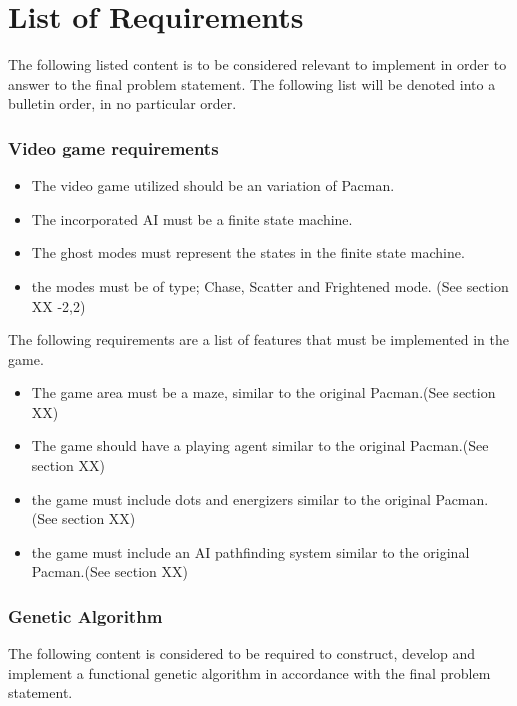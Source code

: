 \section{List of Requirements} \label{sec:lor}

The following listed content is to be considered relevant to implement in order to answer to the final problem statement. The following list will be denoted into a bulletin order, in no particular order.

\subsubsection{Video game requirements}

\begin{itemize}
\item The video game utilized should be an variation of Pacman.
\item The incorporated AI must be a finite state machine.
\item The ghost modes must represent the states in the finite state machine.
\item the modes must be of type; Chase, Scatter and Frightened mode. (See section XX -2,2)
\end{itemize}


The following requirements are a list of features that must be implemented in the game.

\begin{itemize}
\item The game area must be a maze, similar to the original Pacman.(See section XX)
\item The game should have a playing agent similar to the original Pacman.(See section XX)
\item the game must include dots and energizers similar to the original Pacman.(See section XX)
\item the game must include an AI pathfinding system similar to the original Pacman.(See section XX)
\end{itemize}


\subsubsection{Genetic Algorithm}
The following content is considered to be required to construct, develop and implement a functional genetic algorithm in accordance with the final problem statement.


